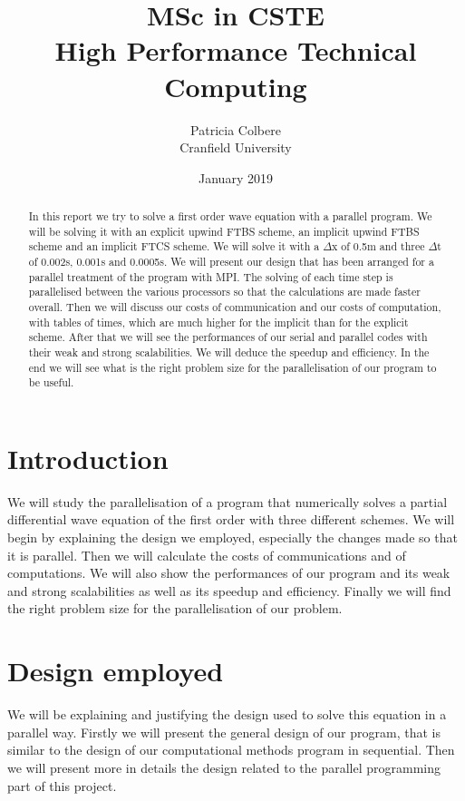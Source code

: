 \documentclass [10 pt, a4 paper]{report}
\title{MSc in CSTE \\ High Performance Technical Computing}
\author{Patricia Colbere \\ Cranfield University}
\date{January 2019}
\begin{document}
\maketitle

\tableofcontents

\begin{abstract}
    In this report we try to solve a first order wave equation with a parallel program. We will be solving it with an explicit upwind FTBS scheme, an implicit upwind FTBS scheme and an implicit FTCS scheme. We will solve it with a $\Delta$x of 0.5m and three $\Delta$t of 0.002s, 0.001s and 0.0005s. We will present our design that has been arranged for a parallel treatment of the program with MPI. The solving of each time step is parallelised between the various processors so that the calculations are made faster overall. Then we will discuss our costs of communication and our costs of computation, with tables of times, which are much higher for the implicit than for the explicit scheme. After that we will see the performances of our serial and parallel codes with their weak and strong scalabilities. We will deduce the speedup and efficiency. In the end we will see what is the right problem size for the parallelisation of our program to be useful.
   

\end{abstract}



\chapter{Introduction}
We will study the parallelisation of a program that numerically solves a partial differential wave equation of the first order with three different schemes. We will begin by explaining the design we employed, especially the changes made so that it is parallel. Then we will calculate the costs of communications and of computations. We will also show the performances of our program and its weak and strong scalabilities as well as its speedup and efficiency. Finally we will find the right problem size for the parallelisation of our problem.





\chapter{Design employed}
We will be explaining and justifying the design used to solve this equation in a parallel way. Firstly we will present the general design of our program, that is similar to the design of our computational methods program in sequential. Then we will present more in details the design related to the parallel programming part of this project.
\end{document}

